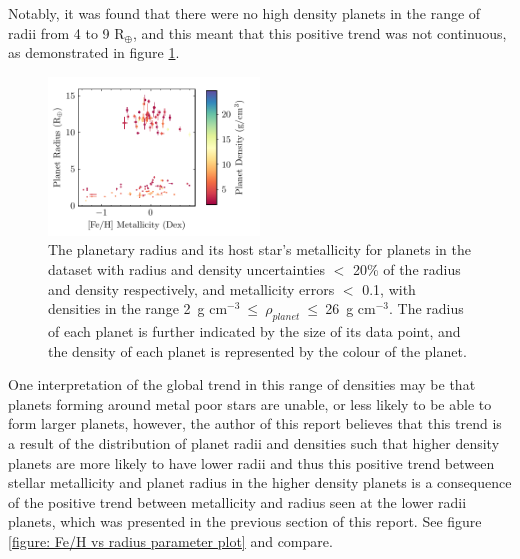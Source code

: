 \documentclass[a4paper,twocolumn,12pt]{article}
\begin{document}
Notably, it was found that there were no high density planets in the range of radii from 4 to 9 R$_{\oplus}$, and this meant that this positive trend was not continuous, as demonstrated in figure \ref{figure: Fe/H vs Radius for high density planets}.

\begin{figure}[h!]
    \centering
    \includegraphics[width=0.5\textwidth]{Graphs/FeH vs Radius Planet Plot Density 2 to 26.pdf}
    \caption{The planetary radius and its host star's metallicity for  planets in the dataset with radius and density uncertainties $<$ 20\% of the radius and density respectively, and metallicity errors $<$ 0.1, with densities in the range 2~g cm$^{-3}~\leq~\rho_{planet}~\leq~$26~g cm$^{-3}$. The radius of each planet is further indicated by the size of its data point, and the density of each planet is represented by the colour of the planet.}
    \label{figure: Fe/H vs Radius for high density planets}
\end{figure}


One interpretation of the global trend in this range of densities may be that planets forming around metal poor stars are unable, or less likely to be able to form larger planets, however, the author of this report believes that this trend is a result of the distribution of planet radii and densities such that higher density planets are more likely to have lower radii and thus this positive trend between stellar metallicity and planet radius in the higher density planets is a consequence of the positive trend between metallicity and radius seen at the lower radii planets, which was presented in the previous section of this report. See figure \ref{figure: Fe/H vs radius parameter plot} and compare.

\end{document}
